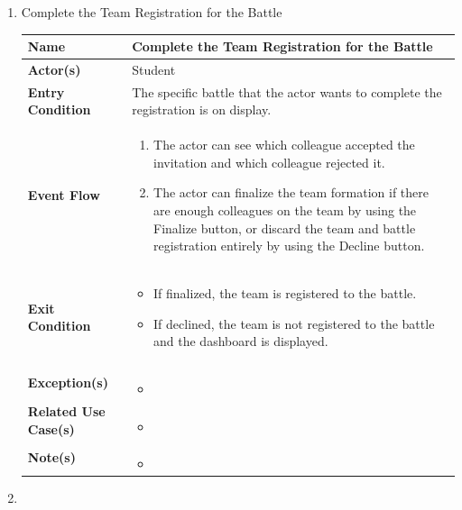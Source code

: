 \begin{enumerate}
\item Complete the Team Registration for the Battle
\begin{center}
    \begin{tabular}{ | m{10em} | m{10cm}| } 
      \hline
      \textbf{Name} & Complete the Team Registration for the Battle  \\ 
      \hline
      \textbf{Actor(s)} & Student \\ 
      \hline
      \textbf{Entry Condition} & The specific battle that the actor wants to complete the registration is on display. \\ 
      \hline
      \textbf{Event Flow} & 
          \begin{enumerate}[(1)]
              \item The actor can see which colleague accepted the invitation and which colleague rejected it.
              \item The actor can finalize the team formation if there are enough colleagues on the team by using the Finalize button, or discard the team and battle registration entirely by using the Decline button.
          \end{enumerate}
      \\ 
      \hline
      \textbf{Exit Condition} & 
      \begin{itemize}
          \item If finalized, the team is registered to the battle.
          \item If declined, the team is not registered to the battle and the dashboard is displayed.
      \end{itemize}\\ 
      \hline
      \textbf{Exception(s)} & 
      \begin{itemize}
          \item 
      \end{itemize}
          \\ 
      \hline
      \textbf{Related Use Case(s)} & 
      \begin{itemize}
          \item 
      \end{itemize}
          \\ 
      \hline
      \textbf{Note(s)} & 
      \begin{itemize}
          \item 
      \end{itemize}
          \\ 
      \hline
    \end{tabular}
\end{center}


\item 


    

\end{enumerate}



